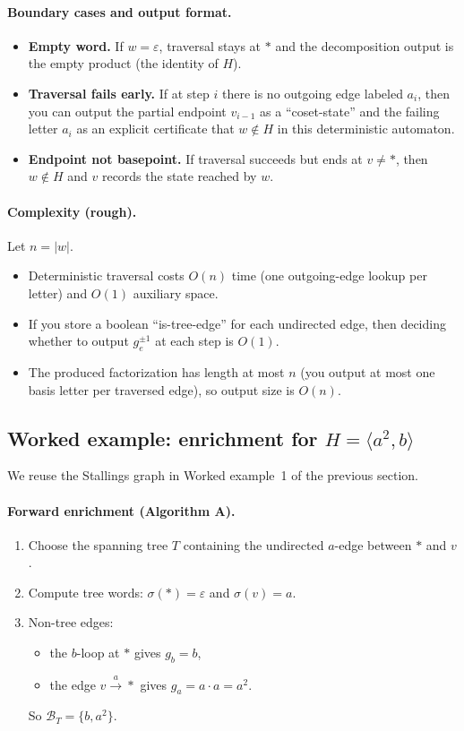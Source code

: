 \documentclass[11pt]{article}
\theoremstyle{definition}
\theoremstyle{plain}
\theoremstyle{remark}
\begin{document}
\paragraph{Boundary cases and output format.}
\begin{itemize}[leftmargin=2em]
\item \textbf{Empty word.} If $w=\varepsilon$, traversal stays at $*$ and the decomposition output is the empty product (the identity of $H$).
\item \textbf{Traversal fails early.} If at step $i$ there is no outgoing edge labeled $a_i$, then you can output the partial endpoint $v_{i-1}$ as a ``coset-state'' and the failing letter $a_i$ as an explicit certificate that $w\notin H$ in this deterministic automaton.
\item \textbf{Endpoint not basepoint.} If traversal succeeds but ends at $v\neq *$, then $w\notin H$ and $v$ records the state reached by $w$.
\end{itemize}

\paragraph{Complexity (rough).}\cite{schreier1927,hatcher2002,cormen2009}
Let $n=|w|$.
\begin{itemize}[leftmargin=2em]
\item Deterministic traversal costs $O(n)$ time (one outgoing-edge lookup per letter) and $O(1)$ auxiliary space.
\item If you store a boolean ``is-tree-edge'' for each undirected edge, then deciding whether to output $g_e^{\pm1}$ at each step is $O(1)$.
\item The produced factorization has length at most $n$ (you output at most one basis letter per traversed edge), so output size is $O(n)$.
\end{itemize}
\subsection*{Worked example: enrichment for $H=\langle a^2,b\rangle$}
We reuse the Stallings graph in Worked example~1 of the previous section.

\paragraph{Forward enrichment (Algorithm A).}
\begin{enumerate}[leftmargin=2.2em]
\item Choose the spanning tree $T$ containing the undirected $a$-edge between $*$ and $v$.
\item Compute tree words: $\sigma(*)=\varepsilon$ and $\sigma(v)=a$.
\item Non-tree edges:
\begin{itemize}[leftmargin=2em]
\item the $b$-loop at $*$ gives $g_b=b$,
\item the edge $v\xrightarrow{a}*$ gives $g_{a}=a\cdot a=a^2$.
\end{itemize}
So $\mathcal B_T=\{b,a^2\}$.
\end{enumerate}
\end{document}
